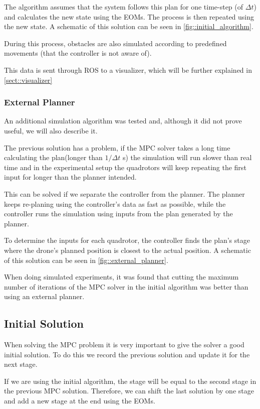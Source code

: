 The algorithm assumes that the system follows this plan for one time-step (of $\Delta t$) and calculates the new state using the \ac{EOMs}. The process is then repeated using the new state. A schematic of this solution can be seen in \cref{fig::initial_algorithm}.

During this process, obstacles are also simulated according to predefined movements (that the controller is not aware of).

This data is sent through \ac{ROS} to a visualizer, which will be further explained in \cref{sect::visualizer}


\subsubsection{External Planner}
An additional simulation algorithm was tested and, although it did not prove useful, we will also describe it.

The previous solution has a problem, if the \ac{MPC} solver takes a long time calculating the plan(longer than $1  / \Delta t$ \si{\second}) the simulation will run slower than real time and in the experimental setup the quadrotors will keep repeating the first input for longer than the planner intended. 

This can be solved if we separate the controller from the planner. The planner keeps re-planing using the controller's data as fast as possible, while the controller runs the simulation using inputs from the plan generated by the planner. 

To determine the inputs for each quadrotor, the controller finds the plan’s stage where the drone’s planned position is closest to the actual position. A schematic of this solution can be seen in \cref{fig::external_planner}.

When doing simulated experiments, it was found that cutting the maximum number of iterations of the \ac{MPC} solver in the initial algorithm was better than using an external planner.

\subsection{Initial Solution}
\label{subsect::initial_solution}
When solving the \ac{MPC} problem it is very important to give the solver a good initial solution. To do this we record the previous solution and update it for the next stage. 

If we are using the initial algorithm, the stage will be equal to the second stage in the previous \ac{MPC} solution. Therefore, we can shift the last solution by one stage and add a new stage at the end using the \ac{EOMs}.

